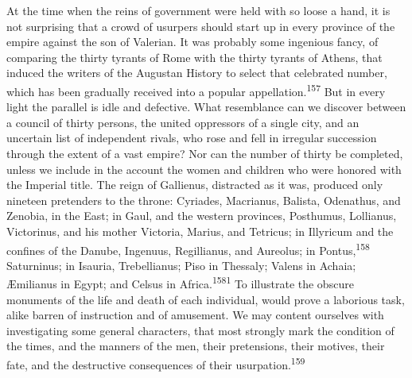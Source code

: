 At the time when the reins of government were held with so loose
a hand, it is not surprising that a crowd of usurpers should
start up in every province of the empire against the son of
Valerian. It was probably some ingenious fancy, of comparing the
thirty tyrants of Rome with the thirty tyrants of Athens, that
induced the writers of the Augustan History to select that
celebrated number, which has been gradually received into a
popular appellation.\textsuperscript{157} But in every light the parallel is idle
and defective. What resemblance can we discover between a council
of thirty persons, the united oppressors of a single city, and an
uncertain list of independent rivals, who rose and fell in
irregular succession through the extent of a vast empire? Nor can
the number of thirty be completed, unless we include in the
account the women and children who were honored with the Imperial
title. The reign of Gallienus, distracted as it was, produced
only nineteen pretenders to the throne: Cyriades, Macrianus,
Balista, Odenathus, and Zenobia, in the East; in Gaul, and the
western provinces, Posthumus, Lollianus, Victorinus, and his
mother Victoria, Marius, and Tetricus; in Illyricum and the
confines of the Danube, Ingenuus, Regillianus, and Aureolus; in
Pontus,\textsuperscript{158} Saturninus; in Isauria, Trebellianus; Piso in
Thessaly; Valens in Achaia; Æmilianus in Egypt; and Celsus in
Africa.\textsuperscript{1581} To illustrate the obscure monuments of the life and
death of each individual, would prove a laborious task, alike
barren of instruction and of amusement. We may content ourselves
with investigating some general characters, that most strongly
mark the condition of the times, and the manners of the men,
their pretensions, their motives, their fate, and the destructive
consequences of their usurpation.\textsuperscript{159}




